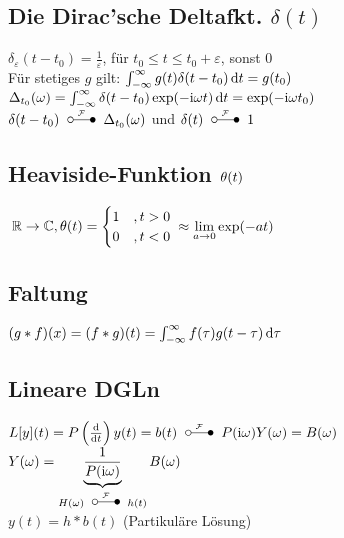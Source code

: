\documentclass[german,color,5pt]{latex4ei/latex4ei_fs}
\begin{document}
\begin{sectionbox}
	\subsection{Die Dirac'sche Deltafkt. $\delta(t)$}
	$\delta_\varepsilon(t-t_0) = \frac{1}{\varepsilon}$, für $t_0 \le t \le t_0 + \varepsilon$, sonst $0$\\
	Für stetiges $g$ gilt: $\int_{-\infty}^\infty g(t) \delta(t-t_0) \diff t = g(t_0)$\\
	$\Delta_{t_0} (\omega) = \int_{-\infty}^\infty \delta(t-t_0) \exp(-\i \omega t) \diff t = \exp(-\i \omega t_0)$\\
	$\delta(t-t_0) \FT \Delta_{t_0} (\omega)$ und $\delta(t) \FT 1$
	
	\subsection{Heaviside-Funktion $\operatorname{\theta}(t)$}
	$\:\operatorname{\mathbb R} \rightarrow \mathbb C, \operatorname{\theta}(t) = \begin{cases} 1 &, t>0 \\ 0 & ,t<0 \end{cases}$ \qquad $\approx \lim\limits_{a \rightarrow 0} \exp(-at)$
	
	\subsection{Faltung}
	$(g*f)(x)=(f*g)(t)=\int_{-\infty}^{\infty}f(\tau)g(t-\tau)\diff \tau$
\end{sectionbox}

\begin{sectionbox}
	\subsection{Lineare DGLn}
	$L[y](t) = P\left(\frac{\diff}{\diff t}\right)y(t) = b(t) \FT P(\i \omega)Y(\omega) = B(\omega)$\\
	$Y(\omega) = \underbrace{\frac{1}{P(\i \omega)}}_{H(\omega) \FT h(t)}B(\omega)$\\
	$y(t) = h*b(t)$ (Partikuläre Lösung)
\end{sectionbox}
\end{document}
